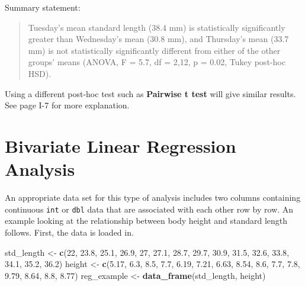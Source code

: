 \documentclass[twoside, 12pt]{article}
\newenvironment{Shaded}{\begin{snugshade}}{\end{snugshade}}
\newcommand{\KeywordTok}[1]{\textcolor[rgb]{0.13,0.29,0.53}{\textbf{{#1}}}}
\newcommand{\DecValTok}[1]{\textcolor[rgb]{0.00,0.00,0.81}{{#1}}}
\newcommand{\FloatTok}[1]{\textcolor[rgb]{0.00,0.00,0.81}{{#1}}}
\newcommand{\StringTok}[1]{\textcolor[rgb]{0.31,0.60,0.02}{{#1}}}
\newcommand{\NormalTok}[1]{{#1}}
\begin{document}
Summary statement:

\begin{quote}
Tuesday's mean standard length (38.4 mm) is statistically significantly
greater than Wednesday's mean (30.8 mm), and Thursday's mean (33.7 mm)
is not statistically significantly different from either of the other
groups' means (ANOVA, F = 5.7, df = 2,12, p = 0.02, Tukey post-hoc HSD).
\end{quote}

Using a different post-hoc test such as \textbf{Pairwise t test} will
give similar results. See page I-7 for more explanation.

\section{Bivariate Linear Regression
Analysis}\label{bivariate-linear-regression-analysis}

An appropriate data set for this type of analysis includes two columns
containing continuous \texttt{int} or \texttt{dbl} data that are
associated with each other row by row. An example looking at the
relationship between body height and standard length follows. First, the
data is loaded in.

\begin{Shaded}
\begin{Highlighting}[]
\NormalTok{std_length <-}\StringTok{ }\KeywordTok{c}\NormalTok{(}\DecValTok{22}\NormalTok{, }\FloatTok{23.8}\NormalTok{, }\FloatTok{25.1}\NormalTok{, }\FloatTok{26.9}\NormalTok{, }\DecValTok{27}\NormalTok{, }
                \FloatTok{27.1}\NormalTok{, }\FloatTok{28.7}\NormalTok{, }\FloatTok{29.7}\NormalTok{, }\FloatTok{30.9}\NormalTok{, }\FloatTok{31.5}\NormalTok{, }
                \FloatTok{32.6}\NormalTok{, }\FloatTok{33.8}\NormalTok{, }\FloatTok{34.1}\NormalTok{, }\FloatTok{35.2}\NormalTok{, }\FloatTok{36.2}\NormalTok{)}
\NormalTok{height <-}\StringTok{ }\KeywordTok{c}\NormalTok{(}\FloatTok{5.17}\NormalTok{, }\FloatTok{6.3}\NormalTok{, }\FloatTok{8.5}\NormalTok{, }\FloatTok{7.7}\NormalTok{, }\FloatTok{6.19}\NormalTok{, }
            \FloatTok{7.21}\NormalTok{, }\FloatTok{6.63}\NormalTok{, }\FloatTok{8.54}\NormalTok{, }\FloatTok{8.6}\NormalTok{, }\FloatTok{7.7}\NormalTok{, }
            \FloatTok{7.8}\NormalTok{, }\FloatTok{9.79}\NormalTok{, }\FloatTok{8.64}\NormalTok{, }\FloatTok{8.8}\NormalTok{, }\FloatTok{8.77}\NormalTok{)}
\NormalTok{reg_example <-}\StringTok{ }\KeywordTok{data_frame}\NormalTok{(std_length, height)}
\end{Highlighting}
\end{Shaded}
\end{document}
